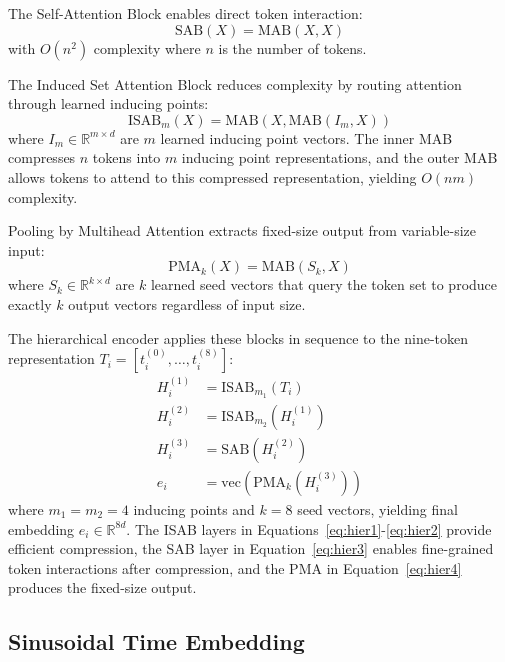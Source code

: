 \documentclass[conference]{IEEEtran}
\begin{document}
The Self-Attention Block enables direct token interaction:
\begin{equation}
\text{SAB}(X) = \text{MAB}(X, X)
\label{eq:sab}
\end{equation}
with $O(n^2)$ complexity where $n$ is the number of tokens.

The Induced Set Attention Block reduces complexity by routing attention through learned inducing points:
\begin{equation}
\text{ISAB}_m(X) = \text{MAB}(X, \text{MAB}(I_m, X))
\label{eq:isab}
\end{equation}
where $I_m \in \mathbb{R}^{m \times d}$ are $m$ learned inducing point vectors. The inner MAB compresses $n$ tokens into $m$ inducing point representations, and the outer MAB allows tokens to attend to this compressed representation, yielding $O(nm)$ complexity.

Pooling by Multihead Attention extracts fixed-size output from variable-size input:
\begin{equation}
\text{PMA}_k(X) = \text{MAB}(S_k, X)
\label{eq:pma}
\end{equation}
where $S_k \in \mathbb{R}^{k \times d}$ are $k$ learned seed vectors that query the token set to produce exactly $k$ output vectors regardless of input size.

The hierarchical encoder applies these blocks in sequence to the nine-token representation $T_i = [t_i^{(0)}, \ldots, t_i^{(8)}]$:
\begin{align}
H_i^{(1)} &= \text{ISAB}_{m_1}(T_i) \label{eq:hier1} \\
H_i^{(2)} &= \text{ISAB}_{m_2}(H_i^{(1)}) \label{eq:hier2} \\
H_i^{(3)} &= \text{SAB}(H_i^{(2)}) \label{eq:hier3} \\
e_i &= \text{vec}(\text{PMA}_k(H_i^{(3)})) \label{eq:hier4}
\end{align}
where $m_1 = m_2 = 4$ inducing points and $k = 8$ seed vectors, yielding final embedding $e_i \in \mathbb{R}^{8d}$. The ISAB layers in Equations~\ref{eq:hier1}-\ref{eq:hier2} provide efficient compression, the SAB layer in Equation~\ref{eq:hier3} enables fine-grained token interactions after compression, and the PMA in Equation~\ref{eq:hier4} produces the fixed-size output.

\subsection{Sinusoidal Time Embedding}
\end{document}
